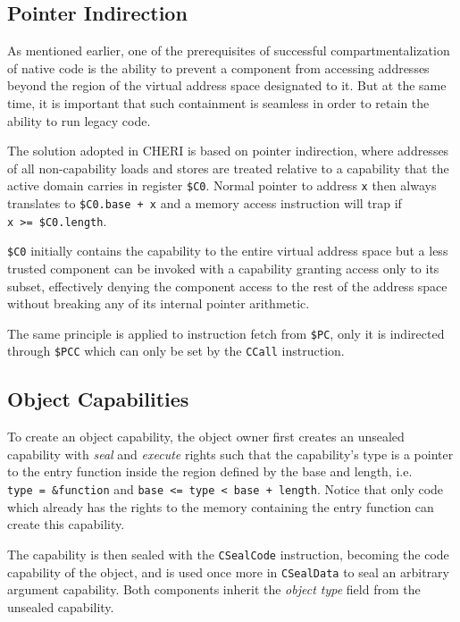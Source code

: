 \documentclass[a4paper,12pt,twoside,openright]{report}
\newcommand{\reg}[1]{\texttt{\$#1}}
\newcommand{\insn}[1]{\texttt{#1}}
\begin{document}
\subsection{Pointer Indirection}

As mentioned earlier, one of the prerequisites of successful compartmentalization of native code is the ability to prevent a component from accessing addresses beyond the region of the virtual address space designated to it. But at the same time, it is important that such containment is seamless in order to retain the ability to run legacy code.

The solution adopted in CHERI is based on pointer indirection, where addresses of all non-capability loads and stores are treated relative to a capability that the active domain carries in register \reg{C0}. Normal pointer to address \texttt{x} then always translates to \texttt{\reg{C0}.base~+~x} and a memory access instruction will trap if \texttt{x~>=~\reg{C0}.length}. 

\reg{C0} initially contains the capability to the entire virtual address space but a less trusted component can be invoked with a capability granting access only to its subset, effectively denying the component access to the rest of the address space without breaking any of its internal pointer arithmetic.

The same principle is applied to instruction fetch from \reg{PC}, only it is indirected through \reg{PCC} which can only be set by the \insn{CCall} instruction.

\subsection{Object Capabilities}

To create an object capability, the object owner first creates an unsealed capability with \emph{seal} and \emph{execute} rights such that the capability's type is a pointer to the entry function inside the region defined by the base and length, i.e. \texttt{type~=~\&function} and \texttt{base~<=~type~<~base~+~length}. Notice that only code which already has the rights to the memory containing the entry function can create this capability. 

The capability is then sealed with the \insn{CSealCode} instruction, becoming the code capability of the object, and is used once more in \insn{CSealData} to seal an arbitrary argument capability. Both components inherit the \emph{object type} field from the unsealed capability.
\end{document}
